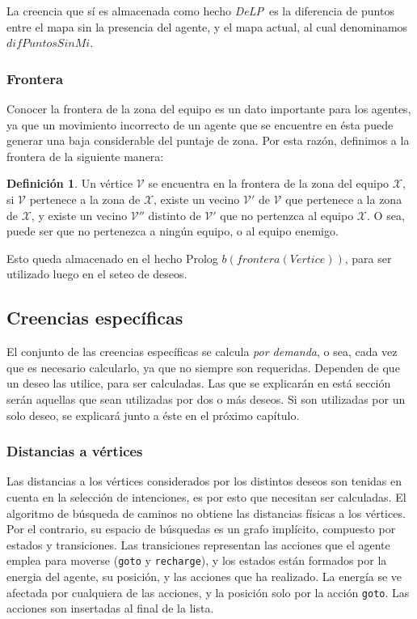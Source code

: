\documentclass[oneside]{book}
\theoremstyle{definition}
\newtheorem{definicion}{Definición}[section]
\newcommand{\DLP}{\mbox{\textit{DeLP}}}
\newcommand{\lit}[1]{\mbox{$ #1$}}
\begin{document}
La creencia que sí es almacenada como hecho \DLP\ es la diferencia de puntos entre
el mapa sin la presencia del agente, y el mapa actual, al cual denominamos
\lit{difPuntosSinMi}.


\subsubsection{Frontera}

Conocer la frontera de la zona del equipo es un dato importante para los agentes,
ya que un movimiento incorrecto de un agente que se encuentre en ésta puede 
generar una baja considerable del puntaje de zona. Por esta razón, definimos a
la frontera de la siguiente manera:

\begin{definicion}
Un vértice $\mathcal V$ se encuentra en la frontera de la zona del equipo 
$\mathcal X$, si $\mathcal V$ pertenece a la zona de $\mathcal X$, existe un 
vecino $\mathcal V'$ de $\mathcal V$ que pertenece a la zona de $\mathcal X$, 
y existe un vecino $\mathcal V''$ distinto de $\mathcal V'$ que no pertenzca 
al equipo $\mathcal X$. O sea, puede ser que no pertenezca a ningún equipo, o 
al equipo enemigo.
\end{definicion}

Esto queda almacenado en el hecho Prolog \lit{b(frontera(Vertice))}, para ser
utilizado luego en el seteo de deseos.

\subsection{Creencias específicas}

\label{sec:creenciasEspecificas}

El conjunto de las creencias específicas se calcula \textit{por demanda}, o sea, 
cada vez que es necesario calcularlo, ya que no siempre son requeridas. Dependen
de que un deseo las utilice, para ser calculadas. Las que se explicarán en está
sección serán aquellas que sean utilizadas por dos o más deseos. Si son 
utilizadas por un solo deseo, se explicará junto a éste en el próximo capítulo.

\subsubsection{Distancias a vértices}

Las distancias a los vértices considerados por los distintos deseos son tenidas en 
cuenta en la selección de intenciones, es por esto que necesitan ser calculadas.
El algoritmo de búsqueda de caminos no obtiene las distancias físicas a los vértices.
Por el contrario, su espacio de búsquedas es un grafo implícito, compuesto por estados
y transiciones. Las transiciones representan las acciones que el agente emplea
para moverse (\texttt{goto} y \texttt{recharge}), y los estados están formados por 
la energia del agente, su posición, y las acciones que ha realizado. La energía se ve
afectada por cualquiera de las acciones, y la posición solo por la acción \texttt{goto}.
Las acciones son insertadas al final de la lista.
\end{document}
